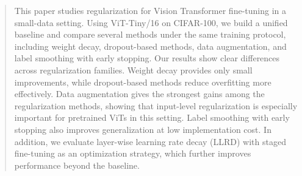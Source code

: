 \begin{abstract}
This paper studies regularization for Vision Transformer fine-tuning in a small-data setting. Using ViT-Tiny/16 on CIFAR-100, we build a unified baseline and compare several methods under the same training protocol, including weight decay, dropout-based methods, data augmentation, and label smoothing with early stopping. Our results show clear differences across regularization families. Weight decay provides only small improvements, while dropout-based methods reduce overfitting more effectively. Data augmentation gives the strongest gains among the regularization methods, showing that input-level regularization is especially important for pretrained ViTs in this setting. Label smoothing with early stopping also improves generalization at low implementation cost. In addition, we evaluate layer-wise learning rate decay (LLRD) with staged fine-tuning as an optimization strategy, which further improves performance beyond the baseline.

\end{abstract}
